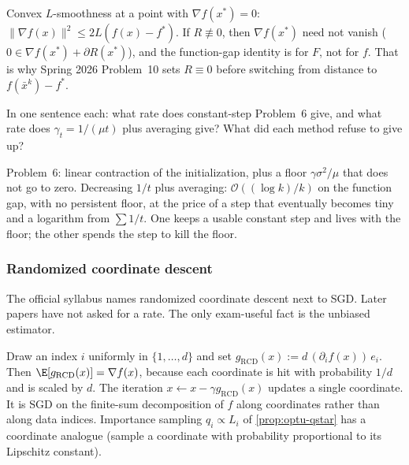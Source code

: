 \begin{solution}
Convex $L$-smoothness at a point with $\nabla f(x^*)=0$: $\|\nabla f(x)\|^2\le 2L(f(x)-f^*)$. If $R\not\equiv 0$, then $\nabla f(x^*)$ need not vanish ($0\in\nabla f(x^*)+\partial R(x^*)$), and the function-gap identity is for $F$, not for $f$. That is why Spring 2026 Problem~10 sets $R\equiv 0$ before switching from distance to $f(\bar x^k)-f^*$.
\end{solution}

\begin{exercise}
\label{ex:optu-two-rates}
In one sentence each: what rate does constant-step Problem~6 give, and what rate does $\gamma_t=1/(\mu t)$ plus averaging give? What did each method refuse to give up?
\end{exercise}

\begin{solution}
Problem~6: linear contraction of the initialization, plus a floor $\gamma\sigma^2/\mu$ that does not go to zero. Decreasing $1/t$ plus averaging: $\mathcal{O}((\log k)/k)$ on the function gap, with no persistent floor, at the price of a step that eventually becomes tiny and a logarithm from $\sum 1/t$. One keeps a usable constant step and lives with the floor; the other spends the step to kill the floor.
\end{solution}


\subsubsection{Randomized coordinate descent}
\label{subsubsec:optu-rcd}

The official syllabus names randomized coordinate descent next to SGD. Later papers have not asked for a rate. The only exam-useful fact is the unbiased estimator.

\begin{definition}
\label{def:optu-rcd}
Draw an index $i$ uniformly in $\{1,\dots,d\}$ and set $g_{\mathrm{RCD}}(x):=d\,(\partial_i f(x))\,e_i$. Then $\E[g_{\mathrm{RCD}}(x)]=\nabla f(x)$, because each coordinate is hit with probability $1/d$ and is scaled by $d$. The iteration $x\leftarrow x-\gamma g_{\mathrm{RCD}}(x)$ updates a single coordinate. It is SGD on the finite-sum decomposition of $f$ along coordinates rather than along data indices. Importance sampling $q_i\propto L_i$ of \cref{prop:optu-qstar} has a coordinate analogue (sample a coordinate with probability proportional to its Lipschitz constant).
\end{definition}


